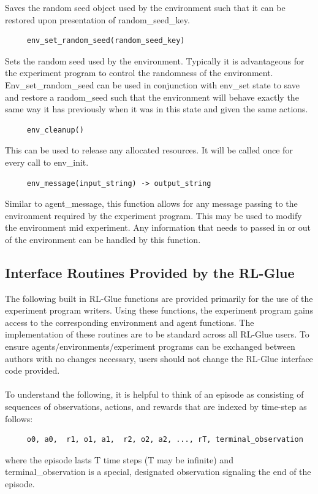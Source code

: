 \documentclass[11pt]{article}
\begin{document}
Saves the random seed object used by the environment such that it can be restored upon presentation of random\_seed\_key.
\begin{verbatim}
     env_set_random_seed(random_seed_key)\end{verbatim}
Sets the random seed used by the environment. Typically it is advantageous for the experiment program to control the randomness of the environment. Env\_set\_random\_seed can be used in conjunction with env\_set state to save and restore a random\_seed such that the environment will behave exactly the same way it has previously when it was in this state and given the same actions.
\begin{verbatim}                 
     env_cleanup()\end{verbatim}
This can be used to release any allocated resources. It will be called once for every call to env\_init.
\begin{verbatim}
     env_message(input_string) -> output_string
\end{verbatim}
Similar to agent\_message, this function allows for any message passing to the environment required by the experiment program. This may be used to modify the environment mid experiment. Any information that needs to passed in or out of the environment can be handled by this function.


\subsection{Interface Routines Provided by the RL-Glue}

The following built in RL-Glue functions are provided primarily for the use of the experiment program writers. Using these functions, the experiment program gains access to the corresponding environment and agent functions. The implementation of these routines are to be standard across all RL-Glue users. To ensure agents/environments/experiment programs can be exchanged between authors with no changes necessary, users should not change the RL-Glue interface code provided.
\\\\      
To understand the following, it is helpful to think of an episode as consisting of sequences of observations, actions, and rewards that are indexed by time-step as follows:
\begin{verbatim}
     o0, a0,  r1, o1, a1,  r2, o2, a2, ..., rT, terminal_observation
\end{verbatim}
where the episode lasts T time steps (T may be infinite) and terminal\_observation is a special, designated observation signaling the end of the episode.
\end{document}
